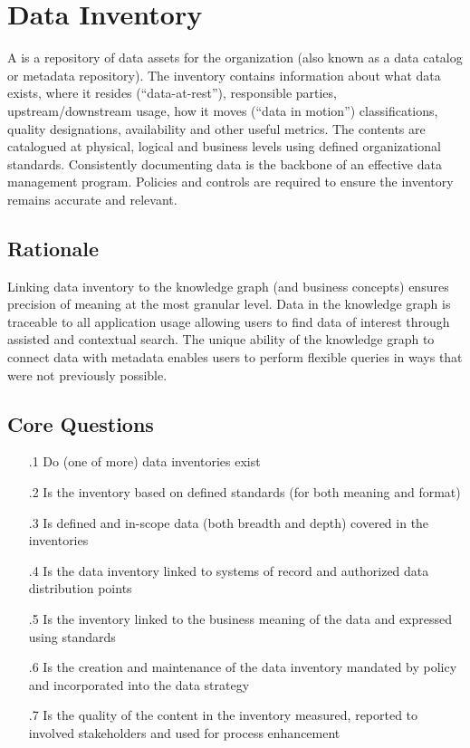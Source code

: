 \section{Data Inventory}\label{sec:b-2-3} %

A  is a repository of data assets for the organization (also known as a data catalog or metadata repository).
The inventory contains information about what data exists, where it resides (“data-at-rest”), responsible parties,
upstream/downstream usage, how it moves (“data in motion”) classifications, quality designations, availability and other useful metrics.
The contents are catalogued at physical, logical and business levels using defined organizational standards.
Consistently documenting data is the backbone of an effective data management program.
Policies and controls are required to ensure the inventory remains accurate and relevant.

\subsection*{ Rationale}

Linking data inventory to the knowledge graph (and business concepts) ensures precision of meaning at the most granular level.
Data in the knowledge graph is traceable to all application usage allowing users to find data of interest through assisted and contextual search.
The unique ability of the knowledge graph to connect data with metadata enables users to perform flexible queries in ways that were not previously possible.

\subsection*{Core Questions}

\begin{itemize}[leftmargin=.5in]

  \item [\thesection.1] Do (one of more) data inventories exist
  \item [\thesection.2] Is the inventory based on defined standards (for both meaning and format)
  \item [\thesection.3] Is defined and in-scope data (both breadth and depth) covered in the inventories
  \item [\thesection.4] Is the data inventory linked to systems of record and authorized data distribution points
  \item [\thesection.5] Is the inventory linked to the business meaning of the data and expressed using standards
  \item [\thesection.6] Is the creation and maintenance of the data inventory mandated by policy and incorporated into the data strategy
  \item [\thesection.7] Is the quality of the content in the inventory measured, reported to involved stakeholders and used for process enhancement

\end{itemize}

